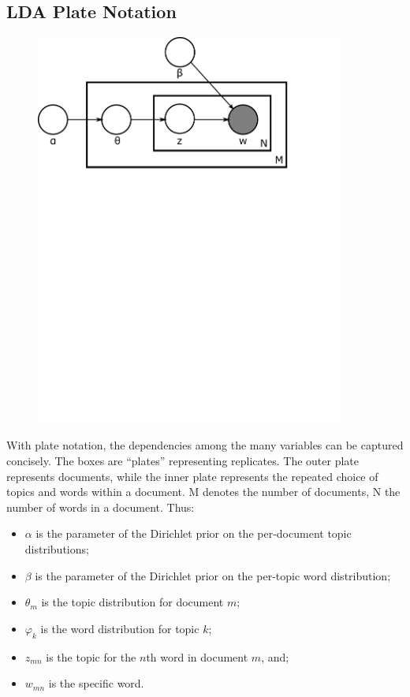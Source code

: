 \documentclass[11pt,a4paper]{article}
\begin{document}
\subsection{LDA Plate Notation}
\begin{figure}
	\centering
	\includegraphics[width=4in]{Latent_Dirichlet_allocation_graphical.pdf}
        \caption{}
      \label{tab:LDA_PlateNotation}
\end{figure}

With plate notation, the dependencies among the many variables can be captured concisely. The boxes are “plates” representing replicates. The outer plate represents documents, while the inner plate represents the repeated choice of topics and words within a document. M denotes the number of documents, N the number of words in a document. Thus:

\begin{itemize}
\item{$\alpha$ is the parameter of the Dirichlet prior on the per-document topic distributions;}
\item{$\beta$ is the parameter of the Dirichlet prior on the per-topic word distribution;}
\item{$\theta _{m}$ is the topic distribution for document $m$;}
\item{$\varphi_{k}$ is the word distribution for topic $k$;}
\item{$z_{mn}$ is the topic for the $n$th word in document $m$, and;}
\item{$w_{mn}$ is the specific word.}
\end{itemize}
\end{document}
